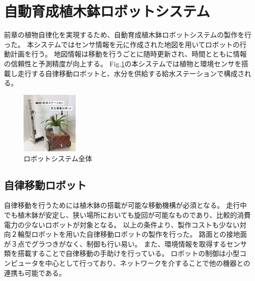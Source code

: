 \documentclass[10pt]{jsarticle}
\begin{document}
\section{自動育成植木鉢ロボットシステム}
前章の植物自律化を実現するため、自動育成植木鉢ロボットシステムの製作を行った。
本システムではセンサ情報を元に作成された地図を用いてロボットの行動計画を行う。
地図情報は移動を行うごとに随時更新され、時間とともに情報の信頼性と予測精度が向上する。
Fig.\ref{robot_all}の本システムでは植物と環境センサを搭載し走行する自律移動ロボットと、水分を供給する給水ステーションで構成される。
\begin{figure}[ht]
    \centering
    \includegraphics[width=0.25\textwidth]{img/IMG_3901a.JPG}
    \caption{ロボットシステム全体}
    \label{robot_all}
\end{figure}
\subsection{自律移動ロボット}
自律移動を行うためには植木鉢の搭載が可能な移動機構が必須となる。
走行中でも植木鉢が安定し、狭い場所においても旋回が可能なものであり、比較的消費電力の少ないロボットが対象となる。
以上の条件より、製作コストも少ない対向２輪型ロボットを用いた自律移動ロボットの製作を行った。
路面との接地面が３点でグラつきがなく、制御も行い易い。
また、環境情報を取得するセンサ類を搭載することで自律移動の手助けを行っている。
ロボットの制御は小型コンピュータを中心として行っており、ネットワークを介することで他の機器との連携も可能である。
\end{document}
